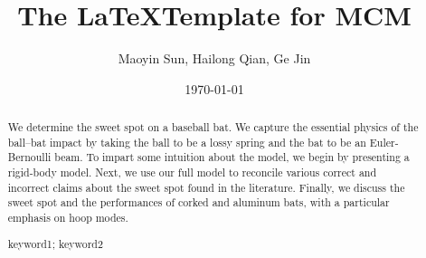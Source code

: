 \documentclass[a4paper,11pt]{article}
\title{The \LaTeX Template for  MCM}
\author{\small {Maoyin Sun, Hailong Qian, Ge Jin}}
\date{\today}
\begin{document}
\begin{abstract}
We determine the sweet spot on a baseball bat. We capture the essential
physics of the ball–bat impact by taking the ball to be a lossy spring and the
bat to be an Euler-Bernoulli beam. To impart some intuition about the model,
we begin by presenting a rigid-body model. Next, we use our full model
to reconcile various correct and incorrect claims about the sweet spot found
in the literature. Finally, we discuss the sweet spot and the performances of
corked and aluminum bats, with a particular emphasis on hoop modes.
\begin{keywords}
keyword1; keyword2
\end{keywords}
\end{abstract}

\maketitle
\pagestyle{empty}
%
\newpage                                                          %


\pagestyle{fancy}                                                     %

\end{document}
